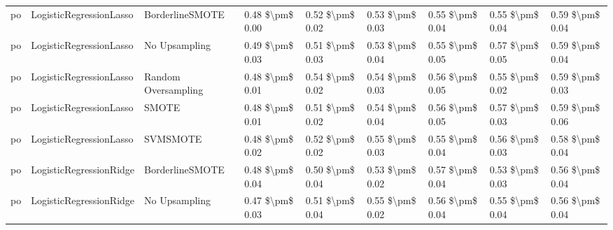 \begin{tabular}{lllllllll}
      po &         LogisticRegressionLasso &               BorderlineSMOTE & 0.48 \$\textbackslash pm\$ 0.00 &           0.52 \$\textbackslash pm\$ 0.02 &       0.53 \$\textbackslash pm\$ 0.03 &        0.55 \$\textbackslash pm\$ 0.04 &                         0.55 \$\textbackslash pm\$ 0.04 &     0.59 \$\textbackslash pm\$ 0.04 \\
      po &         LogisticRegressionLasso &                 No Upsampling & 0.49 \$\textbackslash pm\$ 0.03 &           0.51 \$\textbackslash pm\$ 0.03 &       0.53 \$\textbackslash pm\$ 0.04 &        0.55 \$\textbackslash pm\$ 0.05 &                         0.57 \$\textbackslash pm\$ 0.05 &     0.59 \$\textbackslash pm\$ 0.04 \\
      po &         LogisticRegressionLasso &           Random Oversampling & 0.48 \$\textbackslash pm\$ 0.01 &           0.54 \$\textbackslash pm\$ 0.02 &       0.54 \$\textbackslash pm\$ 0.03 &        0.56 \$\textbackslash pm\$ 0.05 &                         0.55 \$\textbackslash pm\$ 0.02 &     0.59 \$\textbackslash pm\$ 0.03 \\
      po &         LogisticRegressionLasso &                         SMOTE & 0.48 \$\textbackslash pm\$ 0.01 &           0.51 \$\textbackslash pm\$ 0.02 &       0.54 \$\textbackslash pm\$ 0.04 &        0.56 \$\textbackslash pm\$ 0.05 &                         0.57 \$\textbackslash pm\$ 0.03 &     0.59 \$\textbackslash pm\$ 0.06 \\
      po &         LogisticRegressionLasso &                      SVMSMOTE & 0.48 \$\textbackslash pm\$ 0.02 &           0.52 \$\textbackslash pm\$ 0.02 &       0.55 \$\textbackslash pm\$ 0.03 &        0.55 \$\textbackslash pm\$ 0.04 &                         0.56 \$\textbackslash pm\$ 0.03 &     0.58 \$\textbackslash pm\$ 0.04 \\
      po &         LogisticRegressionRidge &               BorderlineSMOTE & 0.48 \$\textbackslash pm\$ 0.04 &           0.50 \$\textbackslash pm\$ 0.04 &       0.53 \$\textbackslash pm\$ 0.02 &        0.57 \$\textbackslash pm\$ 0.04 &                         0.53 \$\textbackslash pm\$ 0.03 &     0.56 \$\textbackslash pm\$ 0.04 \\
      po &         LogisticRegressionRidge &                 No Upsampling & 0.47 \$\textbackslash pm\$ 0.03 &           0.51 \$\textbackslash pm\$ 0.04 &       0.55 \$\textbackslash pm\$ 0.02 &        0.56 \$\textbackslash pm\$ 0.04 &                         0.55 \$\textbackslash pm\$ 0.04 &     0.56 \$\textbackslash pm\$ 0.04 \\

\end{tabular}
